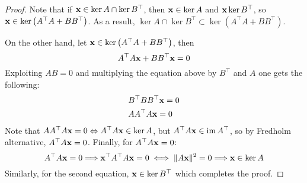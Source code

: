 \begin{proof}
      Note that if \( \mathbf{x} \in \ker A \cap \ker B^\top \), then \( \mathbf{x} \in \ker A \) and \( \mathbf{x} \ker B^\top \), so \( \mathbf{x} \in \ker \left( A^\top A + B B^\top  \right)\). As a result, \( \ker A \cap \ker B^\top \subset \ker \left( A^\top A + B B^\top  \right)\).

      On the other hand, let \( \mathbf{x} \in \ker \left( A^\top A + B B^\top \right)\), then
      \begin{equation}
            A^\top A \mathbf{x}  + B B^\top \mathbf{x} = 0
      \end{equation}
      Exploiting \( A B = 0 \) and multiplying the equation above by \( B^\top \) and \( A \) one gets the following:
      \begin{equation}
            \begin{aligned}
                  & B^\top B B^\top \mathbf{x} = 0 \\
                  & A A^\top A \mathbf{x} = 0 
            \end{aligned}
      \end{equation}
      Note that \( A A^\top A \mathbf{x} = 0 \Leftrightarrow A^\top A \mathbf{x} \in \ker A \), but \( A^\top A \mathbf{x} \in \operatorname{im} A^\top \), so by Fredholm alternative, \( A^\top A \mathbf{x} = 0\). Finally, for \( A^\top A \mathbf{x} = 0\):
      \begin{equation}
             A^\top A \mathbf{x} = 0  \Longrightarrow  \mathbf{x}^\top A^\top A \mathbf{x} = 0 \iff \| A \mathbf{x} \|^2 = 0 \Longrightarrow \mathbf{x} \in \ker A  
      \end{equation}
      Similarly, for the second equation, \( \mathbf{x} \in \ker B^\top \) which completes the proof.
\end{proof}



